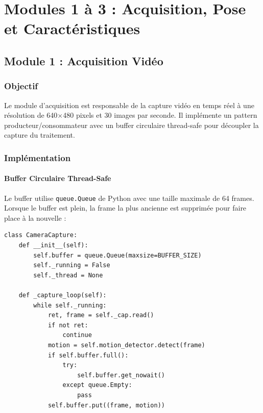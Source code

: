 \chapter{Modules 1 à 3 : Acquisition, Pose et Caractéristiques}

\section{Module 1 : Acquisition Vidéo}

\subsection{Objectif}

Le module d'acquisition est responsable de la capture vidéo en temps réel à une résolution de 640$\times$480 pixels et 30 images par seconde. Il implémente un pattern producteur/consommateur avec un buffer circulaire thread-safe pour découpler la capture du traitement.

\subsection{Implémentation}

\subsubsection{Buffer Circulaire Thread-Safe}

Le buffer utilise \texttt{queue.Queue} de Python avec une taille maximale de 64 frames. Lorsque le buffer est plein, la frame la plus ancienne est supprimée pour faire place à la nouvelle :

\begin{lstlisting}[style=python, caption={Buffer circulaire avec queue.Queue}]
class CameraCapture:
    def __init__(self):
        self.buffer = queue.Queue(maxsize=BUFFER_SIZE)
        self._running = False
        self._thread = None

    def _capture_loop(self):
        while self._running:
            ret, frame = self._cap.read()
            if not ret:
                continue
            motion = self.motion_detector.detect(frame)
            if self.buffer.full():
                try:
                    self.buffer.get_nowait()
                except queue.Empty:
                    pass
            self.buffer.put((frame, motion))
\end{lstlisting}

